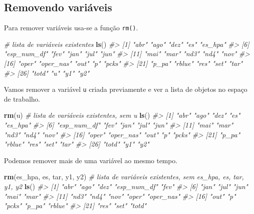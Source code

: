 \documentclass[]{book}
\newenvironment{Shaded}{\begin{snugshade}}{\end{snugshade}}
\newcommand{\KeywordTok}[1]{\textcolor[rgb]{0.13,0.29,0.53}{\textbf{#1}}}
\newcommand{\CommentTok}[1]{\textcolor[rgb]{0.56,0.35,0.01}{\textit{#1}}}
\newcommand{\NormalTok}[1]{#1}
\begin{document}
\subsection{Removendo variáveis}\label{removendo-variaveis}

Para remover variáveis usa-se a função \texttt{rm()}.

\begin{Shaded}
\begin{Highlighting}[]
\CommentTok{# lista de variáveis existentes}
\KeywordTok{ls}\NormalTok{()}
\CommentTok{#>  [1] "abr"        "ago"        "dez"        "es"         "es_hpa"    }
\CommentTok{#>  [6] "esp_num_df" "fev"        "jan"        "jul"        "jun"       }
\CommentTok{#> [11] "mai"        "mar"        "nd3"        "nd4"        "nov"       }
\CommentTok{#> [16] "oper"       "oper_nas"   "out"        "p"          "pcks"      }
\CommentTok{#> [21] "p_pa"       "rblue"      "res"        "set"        "tar"       }
\CommentTok{#> [26] "totd"       "u"          "y1"         "y2"}
\end{Highlighting}
\end{Shaded}

Vamos remover a variável \texttt{u} criada previamente e ver a lista de
objetos no espaço de trabalho.

\begin{Shaded}
\begin{Highlighting}[]
\KeywordTok{rm}\NormalTok{(u)}
\CommentTok{# lista de variáveis existentes, sem u}
\KeywordTok{ls}\NormalTok{()}
\CommentTok{#>  [1] "abr"        "ago"        "dez"        "es"         "es_hpa"    }
\CommentTok{#>  [6] "esp_num_df" "fev"        "jan"        "jul"        "jun"       }
\CommentTok{#> [11] "mai"        "mar"        "nd3"        "nd4"        "nov"       }
\CommentTok{#> [16] "oper"       "oper_nas"   "out"        "p"          "pcks"      }
\CommentTok{#> [21] "p_pa"       "rblue"      "res"        "set"        "tar"       }
\CommentTok{#> [26] "totd"       "y1"         "y2"}
\end{Highlighting}
\end{Shaded}

Podemos remover mais de uma variável ao mesmo tempo.

\begin{Shaded}
\begin{Highlighting}[]
\KeywordTok{rm}\NormalTok{(es_hpa, es, tar, y1, y2)}
\CommentTok{# lista de variáveis existentes, sem es_hpa, es, tar, y1, y2}
\KeywordTok{ls}\NormalTok{()}
\CommentTok{#>  [1] "abr"        "ago"        "dez"        "esp_num_df" "fev"       }
\CommentTok{#>  [6] "jan"        "jul"        "jun"        "mai"        "mar"       }
\CommentTok{#> [11] "nd3"        "nd4"        "nov"        "oper"       "oper_nas"  }
\CommentTok{#> [16] "out"        "p"          "pcks"       "p_pa"       "rblue"     }
\CommentTok{#> [21] "res"        "set"        "totd"}
\end{Highlighting}
\end{Shaded}
\end{document}
